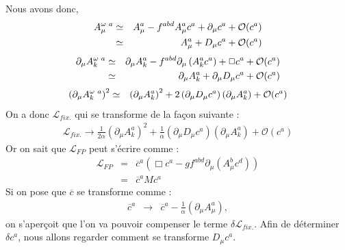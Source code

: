 \documentclass[a4paper,11pt]{article}
\theoremstyle{plain}
\theoremstyle{definition}
\theoremstyle{remark}
\numberwithin{equation}{section}
\numberwithin{equation}{subsection}
\numberwithin{figure}{section}
\begin{document}
\noindent
Nous avons donc, 
\begin{eqnarray}
 A^{\omega \hspace{1mm} a}_{\mu}    &\simeq&    A^{a}_{\mu} - f^{abd} A^{a}_{\mu} c^{a} + \partial_{\mu}c^{a}  + \mathcal{O} (c^{a})\\
                                    &\simeq&    A^{a}_{\mu}  + D_{\mu} c^{a} + \mathcal{O} (c^{a})
\end{eqnarray}
\begin{eqnarray}
 \partial_{\mu}  A^{\omega \hspace{1mm} a}_{k}    &\simeq&    \partial_{\mu} A^{a}_{k} - f^{abd}  \partial_{\mu} \left( A^{a}_{k} c^{a} \right) 
+ \Box c^{a} + \mathcal{O} (c^{a})  \\
                                                  &\simeq&     \partial_{\mu} A^{a}_{k}  + \partial_{\mu}D_{\mu} c^{a} + \mathcal{O} (c^{a})
\end{eqnarray}
\begin{eqnarray}
 \left( \partial_{\mu}  A^{\omega \hspace{1mm} a}_{k} \right)^{2} &\simeq&  \left( \partial_{\mu} A^{a}_{k} \right)^{2} 
+ 2 \left(  \partial_{\mu}D_{\mu} c^{a}  \right) \left( \partial_{\mu} A^{a}_{k} \right) + \mathcal{O} (c^{a})  
\end{eqnarray}
On a donc  $\mathcal{L}_{fix.}$ qui se transforme de la façon suivante :
\begin{eqnarray}
 \mathcal{L}_{fix.}  \rightarrow \frac{1}{2 \alpha} \left( \partial_{\mu} A^{a}_{k} \right)^{2} 
+ \frac{1}{\alpha} \left(  \partial_{\mu}D_{\mu} c^{a}  \right) \left( \partial_{\mu} A^{a}_{k} \right) + \mathcal{O} (c^{a})  
\end{eqnarray}
Or on sait que  $\mathcal{L}_{FP}$ peut s'écrire comme :
\begin{eqnarray}
 \mathcal{L}_{FP} &=&  \overline{c}^{a} \left( \Box c^{a} -g f^{abd} \partial_{\mu} \left( A^{b}_{\mu} c^{d} \right) \right) \\
                  &=&  \overline{c}^{a} M  c^{a}
\end{eqnarray}
Si on pose que $\overline{c}$ se transforme comme :
\begin{eqnarray}
 \overline{c}^{a} &\rightarrow& \overline{c}^{a} - \frac{1}{\alpha} \left( \partial_{\mu} A^{a}_{\mu} \right) ,
\end{eqnarray}
on s'aperçoit que l'on va pouvoir compenser le terme $ \delta \mathcal{L}_{fix.} $.
Afin de déterminer  $ \delta c^{a} $, nous allons regarder comment se transforme $D_{\mu}c^{a}$.
\end{document}
